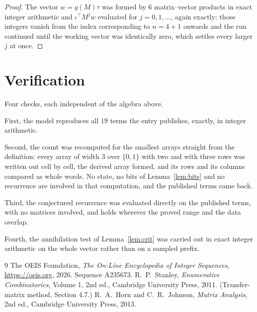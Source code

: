\documentclass[11pt,a4paper]{article}
\theoremstyle{plain}
\theoremstyle{definition}
\begin{document}
\begin{proof}
The vector $w=q(M)\tau$ was formed by $6$ matrix--vector products in exact integer
arithmetic and $\iota^{\!\top}M^{j}w$ evaluated for $j=0,1,\dots$, again exactly; those
integers vanish from the index corresponding to $n=4+1$ onwards and the run continued
until the working vector was identically zero, which settles every larger $j$ at once.
\end{proof}

\section{Verification}

Four checks, each independent of the algebra above.

First, the model reproduces all $19$ terms the entry publishes, exactly, in integer
arithmetic.

Second, the count was recomputed for the smallest arrays straight from the definition: every
array of width $3$ over $\{0,1\}$ with two and with three rows was written out cell by cell,
the derived array formed, and its rows and its columns compared as whole words. No state, no
bits of Lemma~\ref{lem:bits} and no recurrence are involved in that computation, and the
published terms came back.

Third, the conjectured recurrence was evaluated directly on the published terms, with no
matrices involved, and holds wherever the proved range and the data overlap.

Fourth, the annihilation test of Lemma~\ref{lem:crit} was carried out in exact integer
arithmetic on the whole vector rather than on a sampled prefix.

\begin{thebibliography}{9}
 The OEIS Foundation, \emph{The On-Line Encyclopedia of Integer
Sequences}, \url{https://oeis.org}, 2026. Sequence A235673.
 R.~P.~Stanley, \emph{Enumerative Combinatorics}, Volume 1, 2nd ed.,
Cambridge University Press, 2011. (Transfer-matrix method, Section 4.7.)
 R.~A.~Horn and C.~R.~Johnson, \emph{Matrix Analysis}, 2nd ed., Cambridge
University Press, 2013.
\end{thebibliography}
\end{document}
